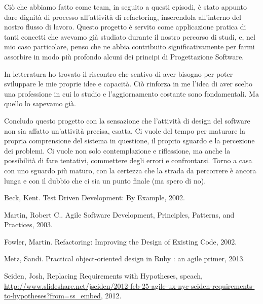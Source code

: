 \documentclass[12pt]{report}
\begin{document}
Ciò che abbiamo fatto come team, in seguito a questi episodi, è stato appunto
dare dignità di processo all'attività di refactoring, inserendola all'interno
del nostro flusso di lavoro. Questo progetto è servito come applicazione 
pratica di tanti concetti che avevamo già studiato durante il nostro percorso
di studi, e, nel mio caso particolare, penso che ne abbia contribuito 
significativamente per farmi assorbire in modo più profondo alcuni dei
principi di Progettazione Software.

In letteratura ho trovato il riscontro che sentivo di aver bisogno per
poter sviluppare le mie proprie idee e capacità. Ciò rinforza in me l'idea
di aver scelto una professione in cui lo studio e l'aggiornamento costante 
sono fondamentali. Ma quello lo sapevamo già.

Concludo questo progetto con la sensazione che l'attività di design del software non sia affatto un'attività precisa, esatta. Ci vuole del tempo per maturare la propria comprensione del sistema in questione, il proprio sguardo e la percezione dei problemi. Ci vuole non solo contemplazione e riflessione, ma anche la possibilità di fare tentativi, commettere degli errori e confrontarsi. Torno a casa con uno sguardo più maturo, con la certezza che la strada da percorrere è ancora lunga e con il dubbio che ci sia un punto finale (ma spero di no).
%


%
%
\begin{thebibliography}{00}
%
Beck, Kent. Test Driven Development: By Example, 2002.

Martin, Robert C.. Agile Software Development, Principles, Patterns, and Practices, 2003.

Fowler, Martin. Refactoring: Improving the Design of Existing Code, 2002.

Metz, Sandi. Practical object-oriented design in Ruby : an agile primer, 2013.

Seiden, Josh, Replacing Requirements with Hypotheses, speach, \url{http://www.slideshare.net/jseiden/2012-feb-25-agile-ux-nyc-seiden-requirements-to-hypotheses?from=ss_embed}, 2012.

\end{thebibliography}
% 
\end{document}
